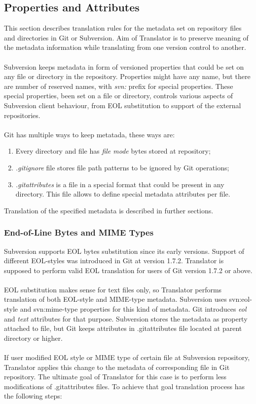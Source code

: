 \subsection{Properties and Attributes}
This section describes translation rules for the metadata set on repository files and directories in Git or Subversion.
Aim of Translator is to preserve meaning of the metadata information while translating from one version control 
to another.
\\\\
Subversion keeps metadata in form of versioned properties that could be set on any file or directory in the repository.
Properties might have any name, but there are number of reserved names, with \emph{svn:} prefix for special properties. 
These special properties, been set on a file or directory, controls various aspects of Subversion client behaviour, 
from EOL substitution to support of the external repositories.
\\\\
Git has multiple ways to keep metatada, these ways are:
\begin{enumerate}
\compactlist
\item Every directory and file has \emph{file mode} bytes stored at repository;
\item \emph{.gitignore} file stores file path patterns to be ignored by Git operations;
\item \emph{.gitattributes} is a file in a special format that could be present in any directory.
This file allows to define special metadata attributes per file.
\end{enumerate}

Translation of the specified metadata is described in further sections.

\subsubsection{End-of-Line Bytes and MIME Types}
Subversion supports EOL bytes substitution since its early versions. Support of different EOL-styles was introduced in Git at version 1.7.2. Translator is supposed to perform valid EOL translation for users of Git version 1.7.2 or above.
\\\\
EOL substitution makes sense for text files only, so Translator performs translation of both EOL-style and MIME-type metadata. Subversion uses svn:eol-style and svn:mime-type properties for this kind of metadata. Git introduces \emph{eol} and \emph{text} attributes for that purpose. Subversion stores the metadata as property attached to file, but Git keeps attributes in .gitattributes file located at parent directory or higher.
\\\\
If user modified EOL style or MIME type of certain file at Subversion repository, Translator applies this change to the metadata of corresponding file in Git repository. The ultimate goal of Translator for this case is to perform less modifications of .gitattributes files. To achieve that goal translation process has the following steps:

